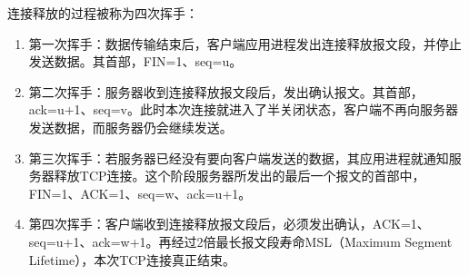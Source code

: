 连接释放的过程被称为四次挥手：

\begin{enumerate}
	\item 第一次挥手：数据传输结束后，客户端应用进程发出连接释放报文段，并停止发送数据。其首部，FIN=1、seq=u。
	
	\item 第二次挥手：服务器收到连接释放报文段后，发出确认报文。其首部，ack=u+1、seq=v。此时本次连接就进入了半关闭状态，客户端不再向服务器发送数据，而服务器仍会继续发送。

	\item 第三次挥手：若服务器已经没有要向客户端发送的数据，其应用进程就通知服务器释放TCP连接。这个阶段服务器所发出的最后一个报文的首部中，FIN=1、ACK=1、seq=w、ack=u+1。
	
	\item 第四次挥手：客户端收到连接释放报文段后，必须发出确认，ACK=1、seq=u+1、ack=w+1。再经过2倍最长报文段寿命MSL（Maximum Segment Lifetime），本次TCP连接真正结束。
\end{enumerate}

\newpage
